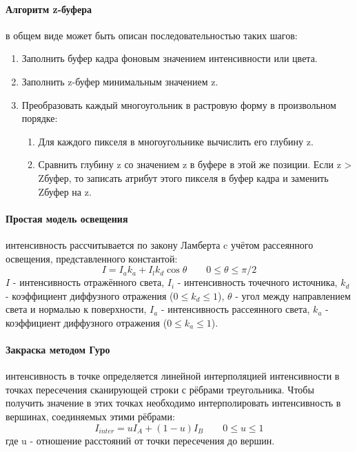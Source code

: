 \paragraph{Алгоритм z-буфера}
в общем виде может быть описан последовательностью таких шагов:
\begin{enumerate}
	\item Заполнить буфер кадра фоновым значением интенсивности или цвета.
	\item Заполнить z-буфер минимальным значением z.
	\item Преобразовать каждый многоугольник в растровую форму в произвольном порядке:
	\begin{enumerate}
		\item Для каждого пикселя в многоугольнике вычислить его глубину z.
		\item Сравнить глубину z со значением z в буфере в этой же позиции. Если z > Zбуфер, то записать атрибут этого пикселя в буфер кадра и заменить Zбуфер на z.
	\end{enumerate}
\end{enumerate}

\paragraph{Простая модель освещения} интенсивность рассчитывается по закону Ламберта c учётом рассеянного освещения, представленного константой:
\begin{equation}\label{lambert2}
I = I_{a}k_{a} + I_{l}k_{d}\cos \theta \qquad 0\leq\theta\leq\pi/2
\end{equation}
$I$ - интенсивность отражённого света, $I_{i}$ - интенсивность точечного источника, $k_{d}$ - коэффициент диффузного отражения ($0\leq k_{d}\leq 1$), $\theta$ - угол между направлением света и нормалью к поверхности, $I_{a}$ - интенсивность рассеянного света, $k_{a}$ - коэффициент диффузного отражения ($0\leq k_{a}\leq 1$).

\paragraph{Закраска методом Гуро} интенсивность в точке определяется линейной интерполяцией интенсивности в точках пересечения сканирующей строки с рёбрами треугольника. Чтобы получить значение в этих точках необходимо интерполировать интенсивность в вершинах, соединяемых этими рёбрами:
\begin{equation}
I_{inter}=uI_{A}+(1-u)I_{B} \qquad 0\leq u \leq 1
\end{equation}
где u - отношение расстояний от точки пересечения до вершин.


